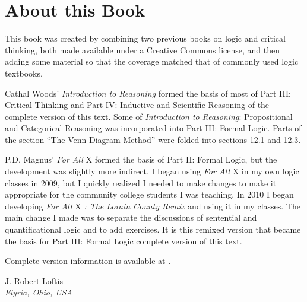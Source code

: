 
\setlength{\parindent}{1em}
\chapter{About this Book}

This book was created by combining two previous books on logic and critical thinking, both made available under a Creative Commons license, and then adding some material so that the coverage matched that of commonly used logic textbooks.

Cathal Woods' \textit{Introduction to Reasoning} \parencite*{Woods2014} formed the basis of most of Part III: Critical Thinking and Part IV: Inductive and Scientific Reasoning of the complete version of this text. \nix{[Details]} Some of \textit{Introduction to Reasoning}: Propositional and Categorical Reasoning was incorporated into Part III: Formal Logic. Parts of the section ``The Venn Diagram Method'' were folded into sections 12.1 and 12.3.%

P.D. Magnus' \textit{For All} X \parencite*{Magnus2008} formed the basis of Part II: Formal Logic, but the development was slightly more indirect. I began using \textit{For All} X in my own logic classes in 2009, but I quickly realized I needed to make changes to make it appropriate for the community college students I was teaching. In 2010 I began developing \textit{For All} X \textit{: The Lorain County Remix} and using it in my classes. The main change I made was to separate the discussions of sentential and quantificational logic and to add exercises. It is this remixed version that became the basis for Part III: Formal Logic complete version of this text. 

 Complete version information is available at \textbookhomepage.


 \begin{adjustwidth}{2em}{0em} 
 J. Robert Loftis \\
\noindent \emph{Elyria, Ohio, USA} 
\end{adjustwidth}

